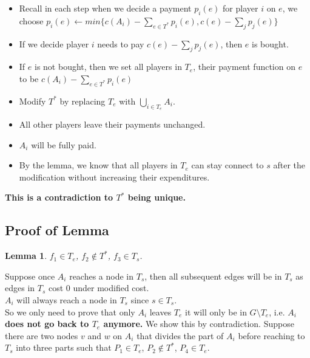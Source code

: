 \documentclass[11pt,psfig,times]{article}
\newtheorem{lemma}{Lemma}[section]
\begin{document}
	
	
	\begin{itemize}
		\item    Recall in each step when we decide a payment $p_i(e)$ for player $i$ on $e$, we choose \(p_i(e) \gets min\{c(A_i) - \sum_{e\in T^*}p_i(e), c(e)-\sum_{j}p_j(e) \}\)
		\item If we decide player $i$ needs to pay $c(e)-\sum_{j}p_j(e) $, then $e$ is bought. 
		\item If $e$ is not bought, then we set all players in $T_e$, their payment function on $e$ to be $c(A_i) - \sum_{e\in T^*}p_i(e)$
	\end{itemize}   
	
		\begin{itemize}
		\item Modify $T^*$ by replacing $T_e$ with \(\bigcup_{i\in T_e} A_i\).
		\item All other players leave their payments unchanged.
		\item $A_i$ will be fully paid. 
		\item By the lemma, we know that all players in $T_e$ can stay connect to $s$ after the modification without increasing their expenditures.
		\end{itemize}
	
		\textbf{This is a contradiction to $T^*$ being unique.}

	
	\subsection{Proof of Lemma}
		\begin{lemma}
			\(f_1 \in T_e\), \(f_2 \notin T^*\), \(f_3 \in T_s\).
		\end{lemma}
		Suppose once $A_i$ reaches a node in $T_s$, then all subsequent edges will be in $T_s$ as edges in $T_s$ cost 0 under modified cost. \\
		$A_i$ will always reach a node in $T_s$ since $s \in T_s$.\\
		So we only need to prove that only $A_i$ leaves $T_e$ it will only be in $G\setminus T_e$, i.e. \textbf{$A_i$ does not go back to $T_e$ anymore.} We show this by contradiction. 
		Suppose there are two nodes \(v\) and \(w\) on \(A_i\) that divides the part of $A_i$ before reaching to $T_s$ into three parts such that \(P_1 \in T_e\), \(P_2 \notin T^*\), \(P_4 \in T_e\).\\
	
\end{document}
